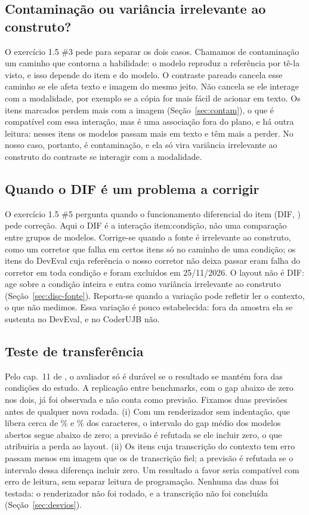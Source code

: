 \subsection{Contaminação ou variância irrelevante ao construto?}
\label{sec:disc-contam}
O exercício 1.5 \#3 pede para separar os dois casos. Chamamos de contaminação um caminho que contorna a habilidade: o modelo reproduz a referência por tê-la visto, e isso depende do item e do modelo. O contraste pareado cancela esse caminho se ele afeta texto e imagem do mesmo jeito. Não cancela se ele interage com a modalidade, por exemplo se a cópia for mais fácil de acionar em texto. Os itens marcados perdem mais com a imagem (Seção~\ref{sec:contam}), o que é compatível com essa interação, mas é uma associação fora do plano, e há outra leitura: nesses itens os modelos passam mais em texto e têm mais a perder. No nosso caso, portanto, é contaminação, e ela só vira variância irrelevante ao construto do contraste se interagir com a modalidade.

\subsection{Quando o DIF é um problema a corrigir}
\label{sec:disc-dif}
O exercício 1.5 \#5 pergunta quando o funcionamento diferencial do item (DIF, \citealp[seç.~5.11]{truong2026measurement}) pede correção. Aqui o DIF é a interação item:condição, não uma comparação entre grupos de modelos. Corrige-se quando a fonte é irrelevante ao construto, como um corretor que falha em certos itens só no caminho de uma condição; os \excludedDev{} itens do DevEval cuja referência o nosso corretor não deixa passar eram falha do corretor em toda condição e foram excluídos em 25/11/2026. O layout não é DIF: age sobre a condição inteira e entra como variância irrelevante ao construto (Seção~\ref{sec:disc-fonte}). Reporta-se quando a variação pode refletir ler o contexto, o que não medimos. Essa variação é pouco estabelecida: fora da amostra ela se sustenta no DevEval, e no CoderUJB não.

\subsection{Teste de transferência}
\label{sec:transferencia}
Pelo cap.~11 de \citet{truong2026measurement}, o avaliador só é durável se o resultado se mantém fora das condições do estudo. A replicação entre benchmarks, com o gap abaixo de zero nos dois, já foi observada e não conta como previsão. Fixamos duas previsões antes de qualquer nova rodada. (i) Com um renderizador sem indentação, que libera cerca de \indentShareUjb{}\% e \indentShareDev{}\% dos caracteres, o intervalo do gap médio dos modelos abertos segue abaixo de zero; a previsão é refutada se ele incluir zero, o que atribuiria a perda ao layout. (ii) Os itens cuja transcrição do contexto tem erro passam menos em imagem que os de transcrição fiel; a previsão é refutada se o intervalo dessa diferença incluir zero. Um resultado a favor seria compatível com erro de leitura, sem separar leitura de programação. Nenhuma das duas foi testada: o renderizador não foi rodado, e a transcrição não foi concluída (Seção~\ref{sec:desvios}).
